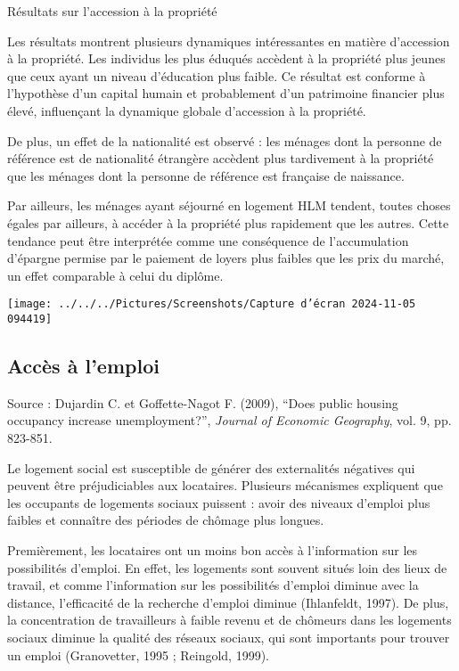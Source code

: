 \documentclass[a4paper, 12pt]{report}
\begin{document}
Résultats sur l'accession à la propriété

Les résultats montrent plusieurs dynamiques intéressantes en matière d'accession à la propriété. Les individus les plus éduqués accèdent à la propriété plus jeunes que ceux ayant un niveau d'éducation plus faible. Ce résultat est conforme à l'hypothèse d'un capital humain et probablement d'un patrimoine financier plus élevé, influençant la dynamique globale d'accession à la propriété.

De plus, un effet de la nationalité est observé : les ménages dont la personne de référence est de nationalité étrangère accèdent plus tardivement à la propriété que les ménages dont la personne de référence est française de naissance. 

Par ailleurs, les ménages ayant séjourné en logement HLM tendent, toutes choses égales par ailleurs, à accéder à la propriété plus rapidement que les autres. Cette tendance peut être interprétée comme une conséquence de l'accumulation d'épargne permise par le paiement de loyers plus faibles que les prix du marché, un effet comparable à celui du diplôme.

\begin{center}
	\texttt{[image: ../../../Pictures/Screenshots/Capture d'écran 2024-11-05 094419]}
\end{center}

\subsection{Accès à l'emploi}

\noindent Source : Dujardin C. et Goffette-Nagot F. (2009), “Does public housing occupancy increase unemployment?”, \textit{Journal of Economic Geography}, vol. 9, pp. 823-851.

Le logement social est susceptible de générer des externalités négatives qui peuvent être préjudiciables aux locataires. Plusieurs mécanismes expliquent que les occupants de logements sociaux puissent : avoir des niveaux d'emploi plus faibles et connaître des périodes de chômage plus longues. 

Premièrement, les locataires ont un moins bon accès à l'information sur les possibilités d'emploi. En effet, les logements sont souvent situés loin des lieux de travail, et comme l'information sur les possibilités d'emploi diminue avec la distance, l'efficacité de la recherche d'emploi diminue (Ihlanfeldt, 1997). De plus, la concentration de travailleurs à faible revenu et de chômeurs dans les logements sociaux diminue la qualité des réseaux sociaux, qui sont importants pour trouver un emploi (Granovetter, 1995 ; Reingold, 1999).
\end{document}

